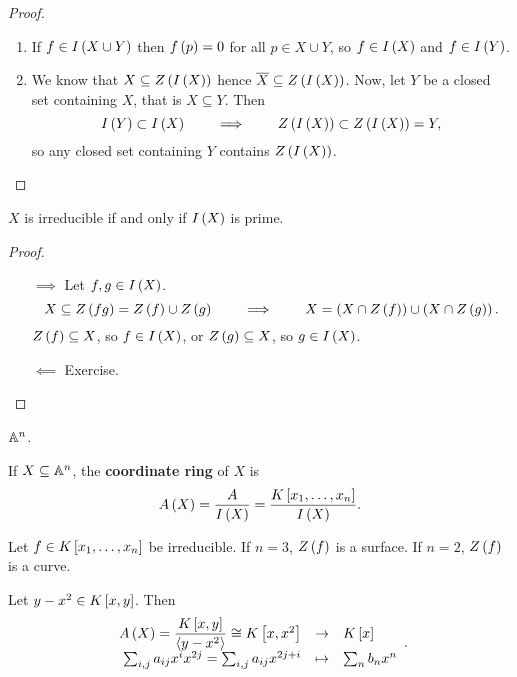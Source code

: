 \begin{proof}
\hfill
\begin{enumerate}
\item If $ f \in I\rb{X \cup Y} $ then $ f\rb{p} = 0 $ for all $ p \in X \cup Y $, so $ f \in I\rb{X} $ and $ f \in I\rb{Y} $.
\item We know that $ X \subseteq Z\rb{I\rb{X}} $ hence $ \overline{X} \subseteq Z\rb{I\rb{X}} $. Now, let $ Y $ be a closed set containing $ X $, that is $ X \subseteq Y $. Then
$$ I\rb{Y} \subset I\rb{X} \qquad \implies \qquad Z\rb{I\rb{X}} \subset Z\rb{I\rb{X}} = Y, $$
so any closed set containing $ Y $ contains $ Z\rb{I\rb{X}} $.
\end{enumerate}
\end{proof}

\begin{proposition}
$ X $ is irreducible if and only if $ I\rb{X} $ is prime.
\end{proposition}

\begin{proof}
\hfill
\begin{itemize}
\item[$ \implies $] Let $ f, g \in I\rb{X} $.
$$ X \subseteq Z\rb{fg} = Z\rb{f} \cup Z\rb{g} \qquad \implies \qquad X = \rb{X \cap Z\rb{f}} \cup \rb{X \cap Z\rb{g}}. $$
$ Z\rb{f} \subseteq X $, so $ f \in I\rb{X} $, or $ Z\rb{g} \subseteq X $, so $ g \in I\rb{X} $.
\item[$ \impliedby $] Exercise.
\end{itemize}
\end{proof}

\begin{example}
$ \A^n $.
\end{example}

\begin{definition}
If $ X \subseteq \A^n $, the \textbf{coordinate ring} of $ X $ is
$$ A\rb{X} = \dfrac{A}{I\rb{X}} = \dfrac{K\sb{x_1, \dots, x_n}}{I\rb{X}}. $$
\end{definition}


\begin{example}
Let $ f \in K\sb{x_1, \dots, x_n} $ be irreducible. If $ n = 3 $, $ Z\rb{f} $ is a surface. If $ n = 2 $, $ Z\rb{f} $ is a curve.
\end{example}

\begin{example}
Let $ y - x^2 \in K\sb{x, y} $. Then
$$ \function{A\rb{X} = \dfrac{K\sb{x, y}}{\ab{y - x^2}} \cong K\sb{x, x^2}}{K\sb{x}}{\sum_{i, j} a_{ij}x^ix^{2j} = \sum_{i, j} a_{ij}x^{2j + i}}{\sum_n b_nx^n}. $$
\end{example}


